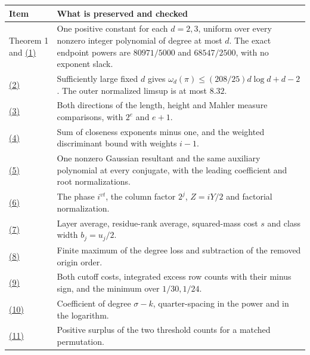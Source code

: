 \documentclass[11pt,a4paper]{article}
\newcounter{none}
\providecommand{\real}[1]{#1}
\begin{document}
{\def\LTcaptype{none} %
{\small
\begin{longtable}[]{@{}
  >{\raggedright\arraybackslash}p{(\linewidth - 2\tabcolsep) * \real{0.22}}
  >{\raggedright\arraybackslash}p{(\linewidth - 2\tabcolsep) * \real{0.78}}@{}}
\toprule\noalign{}
\begin{minipage}[b]{\linewidth}\raggedright
Item
\end{minipage} & \begin{minipage}[b]{\linewidth}\raggedright
What is preserved and checked
\end{minipage} \\
\midrule\noalign{}
\endhead
\bottomrule\noalign{}
\endlastfoot
Theorem 1 and \hyperref[eq:1]{(1)} & One positive constant for each \(d=2,3\), uniform over every nonzero integer polynomial of degree at most \(d\). The exact endpoint powers are \(80971/5000\) and \(68547/2500\), with no exponent slack. \\
\hyperref[eq:2]{(2)} & Sufficiently large fixed \(d\) gives \(\omega_d(\pi)\le(208/25)d\log d+d-2\). The outer normalized limsup is at most \(8.32\). \\
\hyperref[eq:3]{(3)} & Both directions of the length, height and Mahler measure comparisons, with \(2^e\) and \(e+1\). \\
\hyperref[eq:4]{(4)} & Sum of closeness exponents minus one, and the weighted discriminant bound with weights \(i-1\). \\
\hyperref[eq:5]{(5)} & One nonzero Gaussian resultant and the same auxiliary polynomial at every conjugate, with the leading coefficient and root normalizations. \\
\hyperref[eq:6]{(6)} & The phase \(i^{vt}\), the column factor \(2^j\), \(Z=iY/2\) and factorial normalization. \\
\hyperref[eq:7]{(7)} & Layer average, residue-rank average, squared-mass cost \(s\) and class width \(b_j=u_j/2\). \\
\hyperref[eq:8]{(8)} & Finite maximum of the degree loss and subtraction of the removed origin order. \\
\hyperref[eq:9]{(9)} & Both cutoff costs, integrated excess row counts with their minus sign, and the minimum over \(1/30,1/24\). \\
\hyperref[eq:10]{(10)} & Coefficient of degree \(\sigma-k\), quarter-spacing in the power and in the logarithm. \\
\hyperref[eq:11]{(11)} & Positive surplus of the two threshold counts for a matched permutation. \\

\end{longtable}}}
\end{document}
